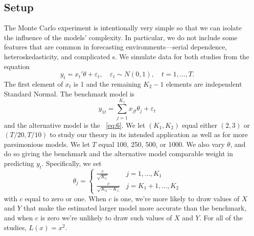 \documentclass[11pt]{article}
\newcommand{\e}{\varepsilon}
\begin{document}
\subsection{Setup}\label{sec:simulation-design}
The Monte Carlo experiment is intentionally very simple so that we can
isolate the influence of the models' complexity.  In particular, we do
not include some features that are common in forecasting
environments---serial dependence, heteroskedasticity, and complicated
\dgp s.  We simulate data for both studies from the equation
\begin{equation}\label{eq:6}
  y_t = x_t'\theta + \e_t,\quad \e_t \sim N(0,1),
  \quad t=1,\dots,T.
\end{equation}
The first element of $x_t$ is 1 and the remaining $K_2-1$ elements are
independent Standard Normal.  The benchmark model is
\begin{equation}
  \label{eq:1}
  y_{1t} = \sum_{j=1}^{K_1} x_{jt}\theta_j + \e_t
\end{equation}
and the alternative model is the \dgp\ \eqref{eq:6}.  We let
$(K_1,K_2)$ equal either $(2,3)$ or $(T/20,T/10)$ to study our theory
in its intended application as well as for more parsimonious models.
We let $T$ equal 100, 250, 500, or 1000.  We also vary $\theta$, and do
so giving the benchmark and the alternative model comparable weight in
predicting $y_t$.  Specifically, we set
\begin{equation*}
  \theta_j =
\begin{cases} \frac{c}{\sqrt{K_1}} & j = 1,\dots,K_1 \\
\frac{c}{\sqrt{K_2 - K_1}} & j = K_1 + 1,\dots,K_2 \end{cases}
\end{equation*}
with $c$ equal to zero or one.  When $c$ is one, we're more likely to
draw values of $X$ and $Y$ that make the estimated larger model more
accurate than the benchmark, and when $c$ is zero we're unlikely to
draw such values of $X$ and $Y$.  For all of the studies, $L(x) =
x^2$.
\end{document}
